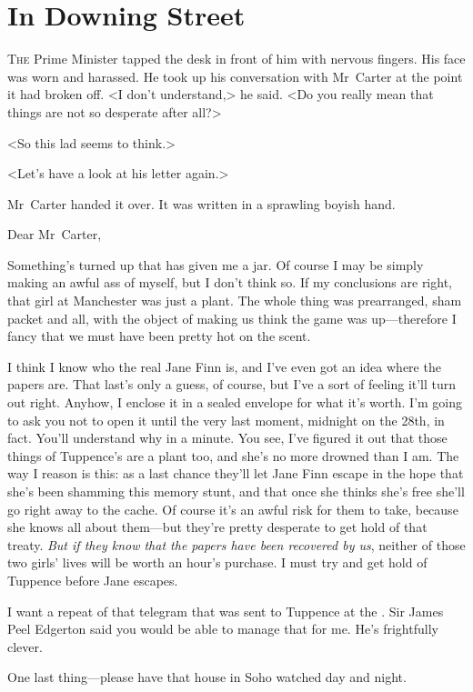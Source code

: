 \chapter{In Downing Street} 

 \lettrine{T}{he} Prime Minister tapped the desk in front of him with nervous fingers. His face was worn and harassed. He took up his conversation with Mr~Carter at the point it had broken off. <I don't understand,> he said. <Do you really mean that things are not so desperate after all?>

<So this lad seems to think.>

<Let's have a look at his letter again.>

Mr~Carter handed it over. It was written in a sprawling boyish hand.

\begin{mail}{}{Dear Mr~Carter,}

Something's turned up that has given me a jar. Of course I may be simply making an awful ass of myself, but I don't think so. If my conclusions are right, that girl at Manchester was just a plant. The whole thing was prearranged, sham packet and all, with the object of making us think the game was up—therefore I fancy that we must have been pretty hot on the scent.

I think I know who the real Jane Finn is, and I've even got an idea where the papers are. That last's only a guess, of course, but I've a sort of feeling it'll turn out right. Anyhow, I enclose it in a sealed envelope for what it's worth. I'm going to ask you not to open it until the very last moment, midnight on the 28th, in fact. You'll understand why in a minute. You see, I've figured it out that those things of Tuppence's are a plant too, and she's no more drowned than I am. The way I reason is this: as a last chance they'll let Jane Finn escape in the hope that she's been shamming this memory stunt, and that once she thinks she's free she'll go right away to the cache. Of course it's an awful risk for them to take, because she knows all about them—but they're pretty desperate to get hold of that treaty. \emph{But if they know that the papers have been recovered by us}, neither of those two girls' lives will be worth an hour's purchase. I must try and get hold of Tuppence before Jane escapes.

I want a repeat of that telegram that was sent to Tuppence at the . Sir James Peel Edgerton said you would be able to manage that for me. He's frightfully clever.

One last thing—please have that house in Soho watched day and night.

\end{mail}

